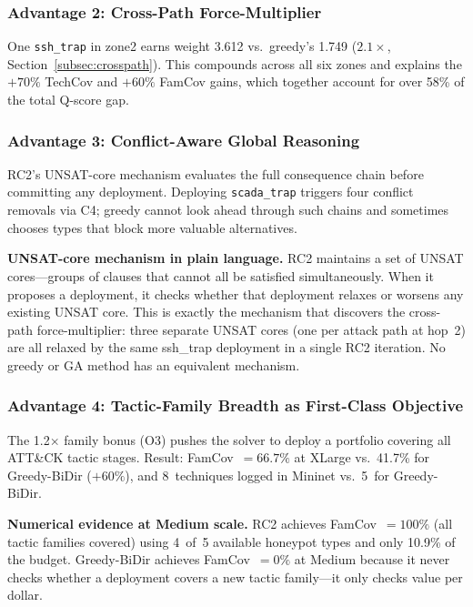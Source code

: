 \documentclass[journal]{IEEEtran}
\begin{document}
\subsubsection{Advantage 2: Cross-Path Force-Multiplier}

One \texttt{ssh\_trap} in zone2 earns weight 3.612
vs.\ greedy's 1.749 ($2.1\times$,
Section~\ref{subsec:crosspath}).
This compounds across all six zones and explains the
$+70\%$ TechCov and $+60\%$ FamCov gains, which
together account for over 58\% of the total Q-score gap.

\subsubsection{Advantage 3: Conflict-Aware Global Reasoning}

RC2's UNSAT-core mechanism evaluates the full consequence
chain before committing any deployment.
Deploying \texttt{scada\_trap} triggers four conflict
removals via C4; greedy cannot look ahead through such
chains and sometimes chooses types that block more valuable
alternatives.

\begin{insightbox}
\textbf{UNSAT-core mechanism in plain language.}
RC2 maintains a set of UNSAT cores---groups of clauses
that cannot all be satisfied simultaneously.
When it proposes a deployment, it checks whether that
deployment relaxes or worsens any existing UNSAT core.
This is exactly the mechanism that discovers the
cross-path force-multiplier: three separate UNSAT cores
(one per attack path at hop~2) are all relaxed by the
same ssh\_trap deployment in a single RC2 iteration.
No greedy or GA method has an equivalent mechanism.
\end{insightbox}

\subsubsection{Advantage 4: Tactic-Family Breadth as First-Class
               Objective}

The 1.2$\times$ family bonus (O3) pushes the solver to
deploy a portfolio covering all ATT\&CK tactic stages.
Result: FamCov~$=66.7\%$ at XLarge vs.\ 41.7\% for
Greedy-BiDir ($+60\%$), and 8~techniques logged in
Mininet vs.\ 5~for Greedy-BiDir.

\begin{examplebox}
\textbf{Numerical evidence at Medium scale.}
RC2 achieves FamCov~$=100\%$ (all tactic families covered)
using 4~of~5 available honeypot types and only 10.9\%
of the budget.
Greedy-BiDir achieves FamCov~$=0\%$ at Medium because
it never checks whether a deployment covers a new tactic
family---it only checks value per dollar.
\end{examplebox}
\end{document}
